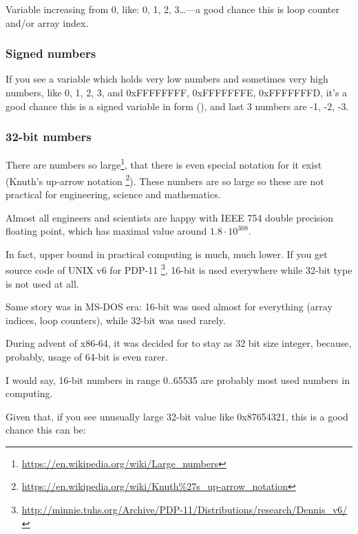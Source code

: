 Variable increasing from 0, like: 0, 1, 2, 3\dots---a good chance this is loop counter and/or array index.

\subsubsection{Signed numbers}

If you see a variable which holds very low numbers and sometimes very high numbers,
like 0, 1, 2, 3, and 0xFFFFFFFF, 0xFFFFFFFE, 0xFFFFFFFD,
it's a good chance this is a signed variable in  form (),
and last 3 numbers are -1, -2, -3.

\subsubsection{32-bit numbers}

There are numbers so large\footnote{\url{https://en.wikipedia.org/wiki/Large_numbers}},
that there is even special notation for it exist (Knuth's up-arrow notation
\footnote{\url{https://en.wikipedia.org/wiki/Knuth\%27s_up-arrow_notation}}).
These numbers are so large so these are not practical for engineering, science and mathematics.

Almost all engineers and scientists are happy with IEEE 754 double precision floating point, which has maximal
value around $1.8 \cdot 10^{308}$.

In fact, upper bound in practical computing is much, much lower.
If you get source code of UNIX v6 for PDP-11
\footnote{\url{http://minnie.tuhs.org/Archive/PDP-11/Distributions/research/Dennis_v6/}},
16-bit  is used everywhere while 32-bit  type is not used at all.

Same story was in MS-DOS era: 16-bit  was used almost for everything (array indices, loop counters),
while 32-bit  was used rarely.

During advent of x86-64, it was decided for  to stay as 32 bit size integer, because, probably,
usage of 64-bit  is even rarer.

I would say, 16-bit numbers in range 0..65535 are probably most used numbers in computing.

Given that, if you see unusually large 32-bit value like 0x87654321, this is a good chance this can be:

